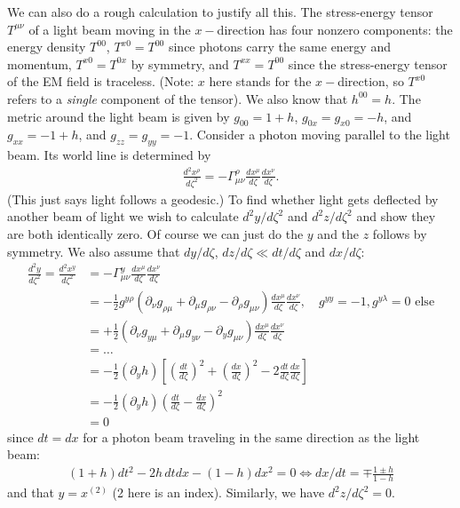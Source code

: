 \documentclass{book}
\theoremstyle{definition}
\newcommand{\p}{\partial}
\newcommand{\nn}{\nonumber}
\newcommand{\f}[2]{\frac{#1}{#2}}
\newcommand{\lp}{\left(}
\newcommand{\rp}{\right)}
\newcommand{\lb}{\left[}
\newcommand{\rb}{\right]}
\begin{document}
We can also do a rough calculation to justify all this. The stress-energy tensor $T^{\mu\nu}$ of a light beam moving in the $x-$direction has four nonzero components: the energy density $T^{00}$, $T^{x0} = T^{00}$ since photons carry the same energy and momentum, $T^{x0} = T^{0x}$ by symmetry, and $T^{xx} = T^{00}$ since the stress-energy tensor of the EM field is traceless. (Note: $x$ here stands for the $x-$direction, so $T^{x0}$ refers to a \textit{single} component of the tensor). We also know that $h^{00} = h$. The metric around the light beam is given by $g_{00} = 1 + h$, $g_{0x} = g_{x0} = -h$, and $g_{xx} = -1 + h$, and $g_{zz} = g_{yy} = -1$. Consider a photon moving parallel to the light beam. Its world line is determined by
\begin{align}
\f{d^2 x^\rho}{d \zeta^2} = -\Gamma^\rho_{\mu\nu} \f{d x^\mu}{d\zeta} \f{d x^\nu}{d \zeta}.
\end{align}
(This just says light follows a geodesic.) To find whether light gets deflected by another beam of light we wish to calculate $d^2 y / d\zeta^2$ and $d^2 z / d\zeta^2$ and show they are both identically zero. Of course we can just do the $y$ and the $z$ follows by symmetry. We also assume that $dy/d\zeta$, $dz/d\zeta \ll dt/d\zeta$ and $dx/d\zeta$:
\begin{align}
\f{d^2y}{d\zeta^2} = \f{d^2 x^y}{d\zeta^2} &= -\Gamma^y_{\mu\nu} \f{d x^\mu}{d\zeta} \f{d x^\nu}{d \zeta}\nn\\
&= -\f{1}{2}g^{y\rho}\lp \p_\nu g_{\rho\mu} + \p_\mu g_{\rho\nu} - \p_\rho g_{\mu\nu} \rp\f{dx^\mu}{d\zeta} \f{dx^\nu}{d \zeta}, \nn \quad g^{yy} = -1, g^{y\lambda} = 0 \text{ else}\\
&= +\f{1}{2}\lp \p_\nu g_{y\mu} + \p_\mu g_{y\nu} - \p_y g_{\mu\nu} \rp\f{dx^\mu}{d\zeta} \f{dx^\nu}{d \zeta} \nn\\
&= \dots\nn\\
&= -\f{1}{2}(\p_y h)\lb \lp \f{dt}{d\zeta} \rp^2 + \lp \f{dx}{d\zeta} \rp^2 - 2\f{dt}{d\zeta}\f{dx}{d\zeta} \rb\nn\\
&= -\f{1}{2}(\p_y h)\lp \f{dt}{d\zeta} - \f{dx}{d\zeta}   \rp^2 \nn\\
&= 0
\end{align}
since $dt = dx$ for a photon beam traveling in the same direction as the light beam:
\begin{align}
(1+h)dt^2 - 2h\,dtdx - (1-h)dx^2 = 0 \iff dx/dt = \mp \f{1\pm h}{1-h}
\end{align}
and that $y = x^{(2)}$ (2 here is an index). Similarly, we have $d^2z/d\zeta^2  =0$.\\
\end{document}
